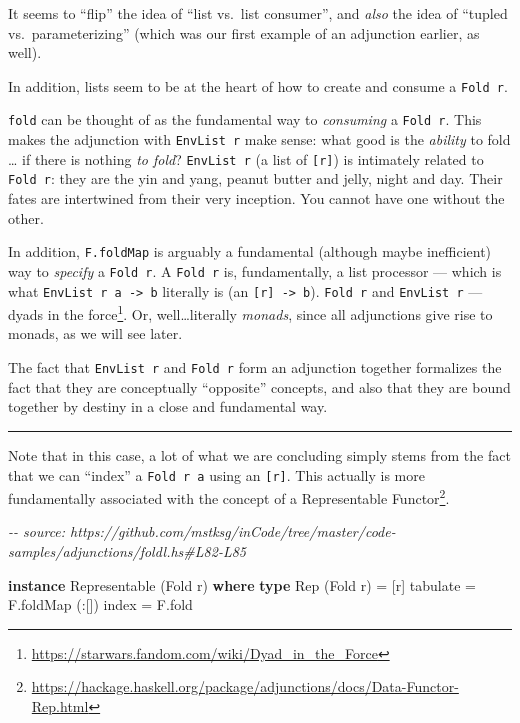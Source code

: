 \documentclass[]{article}
\newenvironment{Shaded}{}{}
\newcommand{\CommentTok}[1]{\textcolor[rgb]{0.38,0.63,0.69}{\textit{#1}}}
\newcommand{\DataTypeTok}[1]{\textcolor[rgb]{0.56,0.13,0.00}{#1}}
\newcommand{\FunctionTok}[1]{\textcolor[rgb]{0.02,0.16,0.49}{#1}}
\newcommand{\KeywordTok}[1]{\textcolor[rgb]{0.00,0.44,0.13}{\textbf{#1}}}
\newcommand{\NormalTok}[1]{#1}
\newcommand{\OperatorTok}[1]{\textcolor[rgb]{0.40,0.40,0.40}{#1}}
\newcommand{\OtherTok}[1]{\textcolor[rgb]{0.00,0.44,0.13}{#1}}
\renewcommand{\href}[2]{#2\footnote{\url{#1}}}
\begin{document}
It seems to ``flip'' the idea of ``list vs.~list consumer'', and \emph{also} the
idea of ``tupled vs.~parameterizing'' (which was our first example of an
adjunction earlier, as well).

In addition, lists seem to be at the heart of how to create and consume a
\texttt{Fold\ r}.

\texttt{fold} can be thought of as the fundamental way to \emph{consuming} a
\texttt{Fold\ r}. This makes the adjunction with \texttt{EnvList\ r} make sense:
what good is the \emph{ability} to fold \ldots{} if there is nothing \emph{to
fold}? \texttt{EnvList\ r} (a list of \texttt{{[}r{]}}) is intimately related to
\texttt{Fold\ r}: they are the yin and yang, peanut butter and jelly, night and
day. Their fates are intertwined from their very inception. You cannot have one
without the other.

In addition, \texttt{F.foldMap} is arguably a fundamental (although maybe
inefficient) way to \emph{specify} a \texttt{Fold\ r}. A \texttt{Fold\ r} is,
fundamentally, a list processor --- which is what
\texttt{EnvList\ r\ a\ -\textgreater{}\ b} literally is (an
\texttt{{[}r{]}\ -\textgreater{}\ b}). \texttt{Fold\ r} and \texttt{EnvList\ r}
--- \href{https://starwars.fandom.com/wiki/Dyad_in_the_Force}{dyads in the
force}. Or, well\ldots literally \emph{monads}, since all adjunctions give rise
to monads, as we will see later.

The fact that \texttt{EnvList\ r} and \texttt{Fold\ r} form an adjunction
together formalizes the fact that they are conceptually ``opposite'' concepts,
and also that they are bound together by destiny in a close and fundamental way.

\begin{center}\rule{0.5\linewidth}{\linethickness}\end{center}

Note that in this case, a lot of what we are concluding simply stems from the
fact that we can ``index'' a \texttt{Fold\ r\ a} using an \texttt{{[}r{]}}. This
actually is more fundamentally associated with the concept of a
\href{https://hackage.haskell.org/package/adjunctions/docs/Data-Functor-Rep.html}{Representable
Functor}.

\begin{Shaded}
\begin{Highlighting}[]
\CommentTok{{-}{-} source: https://github.com/mstksg/inCode/tree/master/code{-}samples/adjunctions/foldl.hs\#L82{-}L85}

\KeywordTok{instance} \DataTypeTok{Representable}\NormalTok{ (}\DataTypeTok{Fold}\NormalTok{ r) }\KeywordTok{where}
    \KeywordTok{type} \DataTypeTok{Rep}\NormalTok{ (}\DataTypeTok{Fold}\NormalTok{ r) }\OtherTok{=}\NormalTok{ [r]}
\NormalTok{    tabulate }\OtherTok{=}\NormalTok{ F.foldMap (}\OperatorTok{:}\NormalTok{[])}
    \FunctionTok{index}    \OtherTok{=}\NormalTok{ F.fold}
\end{Highlighting}
\end{Shaded}
\end{document}
